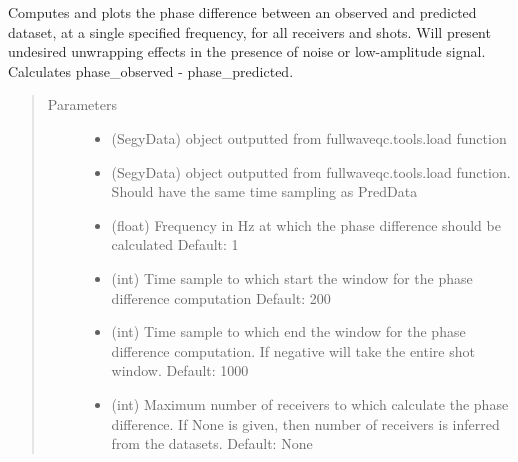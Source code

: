 \documentclass[letterpaper,10pt,english]{sphinxmanual}
\begin{document}

\begin{fulllineitems}
\label{\detokenize{index:fullwaveqc.siganalysis.phasediff}}
Computes and plots the phase difference between an observed and predicted dataset, at a single specified frequency,
for all receivers and shots. Will present undesired unwrapping effects in the presence of noise or low-amplitude
signal. Calculates phase\_observed - phase\_predicted.
\begin{quote}\begin{description}
\item[{Parameters}] \leavevmode\begin{itemize}
\item {} 
 \textendash{} (SegyData)  object outputted from fullwaveqc.tools.load function

\item {} 
 \textendash{} (SegyData)  object outputted from fullwaveqc.tools.load function. Should have the same time
sampling as PredData

\item {} 
 \textendash{} (float)     Frequency in Hz at which the phase difference should be calculated
Default: 1

\item {} 
 \textendash{} (int)       Time sample to which start the window for the phase difference computation
Default: 200

\item {} 
 \textendash{} (int)       Time sample to which end the window for the phase difference computation.
If negative will take the entire shot window.
Default: 1000

\item {} 
 \textendash{} (int)       Maximum number of receivers to which calculate the phase difference. If None is
given, then number of receivers is inferred from the datasets.
Default: None


\end{itemize}
\end{description}
\end{quote}
\end{fulllineitems}
\end{document}
